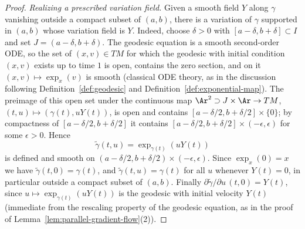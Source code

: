 \begin{proof}
\emph{Realizing a prescribed variation field.} Given a smooth field
$Y$ along $\gamma$ vanishing outside a compact subset of $(a,b)$,
there is a variation of $\gamma$ supported in $(a,b)$ whose variation
field is $Y$. Indeed, choose $\delta>0$ with
$[a-\delta,b+\delta]\subset I$ and set $J=(a-\delta,b+\delta)$. The
geodesic equation is a smooth second-order ODE, so the set of
$(x,v)\in TM$ for which the geodesic with initial condition $(x,v)$
exists up to time $1$ is open, contains the zero section, and on it
$(x,v)\mapsto\exp_x(v)$ is smooth (classical ODE theory, as in the
discussion following Definition~\ref{def:geodesic} and
Definition~\ref{def:exponential-map}). The preimage of this open set
under the continuous map $\Ar^2\supset J\times\Ar\to TM$,
$(t,u)\mapsto\left(\gamma(t),uY(t)\right)$, is open and contains
$[a-\delta/2,b+\delta/2]\times\{0\}$; by compactness of
$[a-\delta/2,b+\delta/2]$ it contains
$[a-\delta/2,b+\delta/2]\times(-\epsilon,\epsilon)$ for some
$\epsilon>0$. Hence
$$\tilde\gamma(t,u)=\exp_{\gamma(t)}\left(uY(t)\right)$$
is defined and smooth on
$(a-\delta/2,b+\delta/2)\times(-\epsilon,\epsilon)$. Since
$\exp_x(0)=x$ we have $\tilde\gamma(t,0)=\gamma(t)$, and
$\tilde\gamma(t,u)=\gamma(t)$ for all $u$ whenever $Y(t)=0$, in
particular outside a compact subset of $(a,b)$. Finally
$\partial\tilde\gamma/\partial u\,(t,0)=Y(t)$, since
$u\mapsto\exp_{\gamma(t)}(uY(t))$ is the geodesic with initial
velocity $Y(t)$ (immediate from the rescaling property of the geodesic
equation, as in the proof of
Lemma~\ref{lem:parallel-gradient-flow}(2)).


\end{proof}
